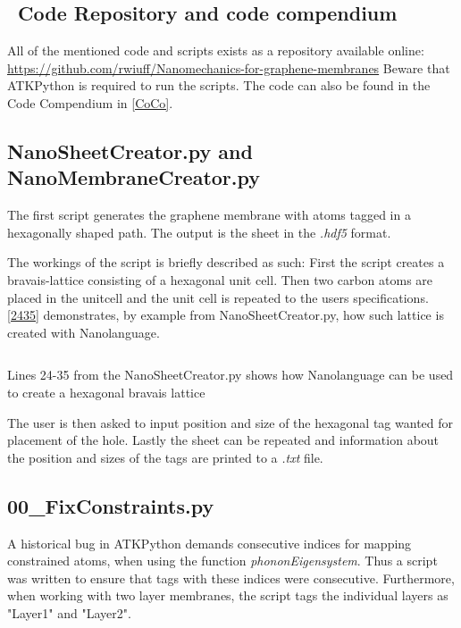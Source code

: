 \subsection{\faGithub \ Code Repository and code compendium}
All of the mentioned code and scripts exists as a repository available online:\newline
\url{https://github.com/rwiuff/Nanomechanics-for-graphene-membranes}
Beware that ATKPython\cite{QuantumWise} is required to run the scripts.
The code can also be found in the Code Compendium in \cref{CoCo}.

\subsection{NanoSheetCreator.py and NanoMembraneCreator.py}\label{NSCS}
The first script generates the graphene membrane with atoms tagged in a hexagonally shaped path. The output is the sheet in the \textit{.hdf5} format.

The workings of the script is briefly described as such:
First the script creates a bravais-lattice consisting of a hexagonal unit cell. Then two carbon atoms are placed in the unitcell and the unit cell is repeated to the users specifications. \cref{2435} demonstrates, by example from NanoSheetCreator.py, how such lattice is created with Nanolanguage.
\onecolumngrid

\begin{listing}[H]
 \inputminted[python3=true,bgcolor=Black,linenos=true,firstline=24,lastline=35]{python}{Listings/NanoSheetCreator.py}
 \caption{Lines 24-35 from the NanoSheetCreator.py shows how Nanolanguage can be used to create a hexagonal bravais lattice}
 \label{2435}
\end{listing}
\twocolumngrid
The user is then asked to input position and size of the hexagonal tag wanted for placement of the hole. Lastly the sheet can be repeated and information about the position and sizes of the tags are printed to a \textit{.txt} file.

\subsection{00\_FixConstraints.py}\label{00}
A historical bug in ATKPython demands consecutive indices for mapping constrained atoms, when using the function \textit{phononEigensystem}. Thus a script was written to ensure that tags with these indices were consecutive. Furthermore, when working with two layer membranes, the script tags the individual layers as "Layer1" and "Layer2".

